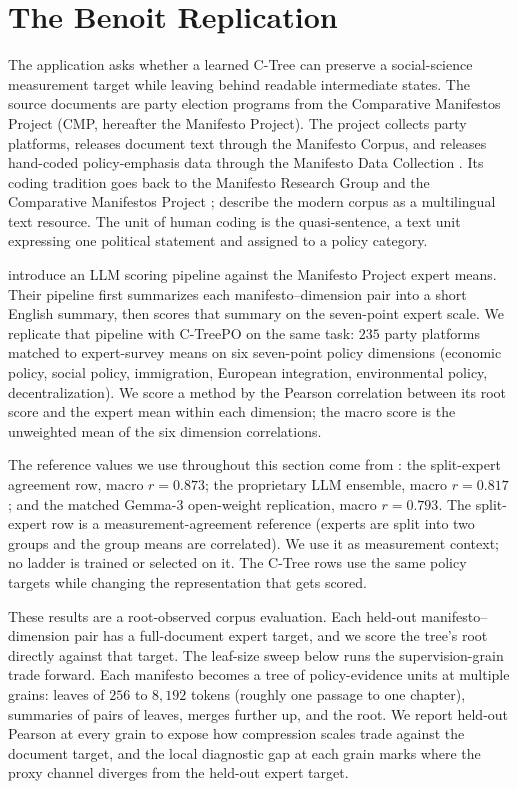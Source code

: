 \section{The Benoit Replication}
\label{sec:v8-manifesto-results}

The application asks whether a learned C-Tree can preserve a
social-science measurement target while leaving behind readable
intermediate states. The source documents are party election
programs from the Comparative Manifestos Project (CMP, hereafter the
Manifesto Project). The project collects party platforms, releases
document text through the Manifesto Corpus, and releases hand-coded
policy-emphasis data through the Manifesto Data Collection
\citep{ManifestoProject2025a,ManifestoCorpus2025}. Its coding
tradition goes back to the Manifesto Research Group and the
Comparative Manifestos Project
\citep{BudgeRobertsonHearl1987,BudgeEtAl2001,KlingemannEtAl2006,VolkensEtAl2013};
\citet{MerzEtAl2016} describe the modern corpus as a multilingual
text resource. The unit of human coding is the quasi-sentence, a
text unit expressing one political statement and assigned to a
policy category.

\citet{BenoitEtAl2025} introduce an LLM scoring pipeline against the
Manifesto Project expert means. Their pipeline first summarizes each
manifesto--dimension pair into a short English summary, then scores
that summary on the seven-point expert scale. We replicate that
pipeline with C-TreePO on the same task: \(235\) party platforms
matched to expert-survey means on six seven-point policy dimensions
(economic policy, social policy, immigration, European integration,
environmental policy, decentralization). We score a method by the
Pearson correlation between its root score and the expert mean
within each dimension; the macro score is the unweighted mean of the
six dimension correlations.

The reference values we use throughout this section come from
\citet{BenoitEtAl2025}: the split-expert agreement row, macro
\(r=0.873\); the proprietary LLM ensemble, macro \(r=0.817\); and
the matched Gemma-3 open-weight replication, macro \(r=0.793\). The
split-expert row is a measurement-agreement reference (experts are
split into two groups and the group means are correlated). We use
it as measurement context; no ladder is trained or selected on it.
The C-Tree rows use the same policy targets while changing the
representation that gets scored.

These results are a root-observed corpus evaluation. Each held-out
manifesto--dimension pair has a full-document expert target, and we
score the tree's root directly against that target. The leaf-size
sweep below runs the supervision-grain trade forward. Each
manifesto becomes a tree of policy-evidence units at multiple
grains: leaves of $256$ to $8{,}192$ tokens (roughly one passage to
one chapter), summaries of pairs of leaves, merges further up, and
the root. We report held-out Pearson at every grain to expose how
compression scales trade against the document target, and the local
diagnostic gap at each grain marks where the proxy channel diverges
from the held-out expert target.

